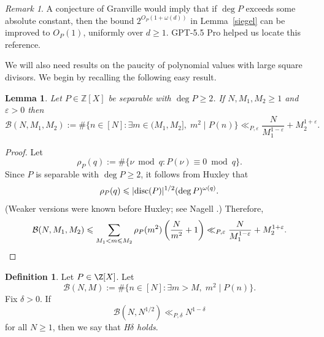 \documentclass[reqno, 12pt]{amsart}
\theoremstyle{plain}
\newtheorem{lemma}[theorem]{Lemma}
\theoremstyle{definition}
\newtheorem{definition}[theorem]{Definition}
\theoremstyle{remark}
\newtheorem*{remark}{Remark}
\renewcommand{\le}{\leqslant}
\renewcommand{\ge}{\geqslant}
\renewcommand{\leq}{\leqslant}
\begin{document}
\begin{remark}
A conjecture of Granville \cite[Conjecture~1.5(i)]{GranvilleTwists}
would imply that if $\deg{P}$ exceeds some absolute constant,
then the bound $2^{O_P(1+\omega(d))}$
in Lemma~\ref{siegel}
can be improved to $O_P(1)$, uniformly over $d\ge 1$.
GPT-5.5 Pro helped us locate this reference.
\end{remark}

We will also need results on the paucity of polynomial values with large square divisors.
We begin by recalling the following easy result.

\begin{lemma}
\label{easy-sieve}
Let \(P\in \mathbb Z[X]\) be separable with $\deg{P}\ge 2$.
If $N,M_1,M_2\ge 1$ and $\varepsilon>0$ then
\begin{equation*}
\mathcal{B}(N,M_1,M_2):= \#\{n\in [N]: \exists m\in (M_1,M_2],\; m^2\mid P(n)\}
\ll_{P,\varepsilon} \frac{N}{M_1^{1-\varepsilon}}
+ M_2^{1+\varepsilon}.
\end{equation*}
\end{lemma}

\begin{proof}
Let
\begin{equation}
    \label{def rhoP}
 \rho_P(q):=\#\{\nu\bmod q:P(\nu)\equiv0\bmod q\}.
\end{equation}
Since \(P\) is separable with $\deg{P}\ge 2$,
it follows from
Huxley \cite{Huxley}
that
\begin{equation}
\label{rho-bound}
 \rho_P(q)\le |\textnormal{disc}(P)|^{1/2} (\deg{P})^{\omega(q)}.
\end{equation}
(Weaker versions were known before Huxley;
see Nagell \cite[pp.~87--90]{NagellBook}.)
Therefore,
\begin{equation*}
\mathcal{B}(N,M_1,M_2) \le \sum_{M_1<m\leq M_2} \rho_P(m^2) \left(\frac{N}{m^2} + 1\right)
\ll_{P,\varepsilon} \frac{N}{M_1^{1-\varepsilon}}
+ M_2^{1+\varepsilon}.
\qedhere
\end{equation*}
\end{proof}

\begin{definition}
Let $P\in \Z[X]$.
Let $$\mathcal{B}(N,M) := \#\{n\in [N]: \exists m>M,\; m^2\mid P(n)\}.$$
Fix $\delta>0$.
If
\begin{equation}
\label{SFSC}
\mathcal{B}(N,N^{1/2}) \ll_{P,\delta} N^{1-\delta}
\end{equation}
for all $N\ge 1$,
then we say that \emph{H$\delta$ holds}.
\end{definition}
\end{document}
